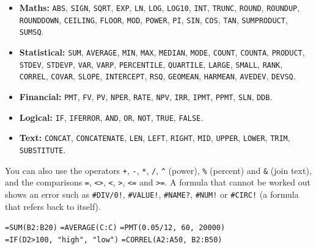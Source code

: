 \documentclass[11pt,a4paper]{article}
\begin{document}
\begin{itemize}
  \item \textbf{Maths:} \texttt{ABS}, \texttt{SIGN}, \texttt{SQRT},
        \texttt{EXP}, \texttt{LN}, \texttt{LOG}, \texttt{LOG10}, \texttt{INT},
        \texttt{TRUNC}, \texttt{ROUND}, \texttt{ROUNDUP}, \texttt{ROUNDDOWN},
        \texttt{CEILING}, \texttt{FLOOR}, \texttt{MOD}, \texttt{POWER},
        \texttt{PI}, \texttt{SIN}, \texttt{COS}, \texttt{TAN},
        \texttt{SUMPRODUCT}, \texttt{SUMSQ}.
  \item \textbf{Statistical:} \texttt{SUM}, \texttt{AVERAGE}, \texttt{MIN},
        \texttt{MAX}, \texttt{MEDIAN}, \texttt{MODE}, \texttt{COUNT},
        \texttt{COUNTA}, \texttt{PRODUCT}, \texttt{STDEV}, \texttt{STDEVP},
        \texttt{VAR}, \texttt{VARP}, \texttt{PERCENTILE}, \texttt{QUARTILE},
        \texttt{LARGE}, \texttt{SMALL}, \texttt{RANK}, \texttt{CORREL},
        \texttt{COVAR}, \texttt{SLOPE}, \texttt{INTERCEPT}, \texttt{RSQ},
        \texttt{GEOMEAN}, \texttt{HARMEAN}, \texttt{AVEDEV}, \texttt{DEVSQ}.
  \item \textbf{Financial:} \texttt{PMT}, \texttt{FV}, \texttt{PV},
        \texttt{NPER}, \texttt{RATE}, \texttt{NPV}, \texttt{IRR}, \texttt{IPMT},
        \texttt{PPMT}, \texttt{SLN}, \texttt{DDB}.
  \item \textbf{Logical:} \texttt{IF}, \texttt{IFERROR}, \texttt{AND},
        \texttt{OR}, \texttt{NOT}, \texttt{TRUE}, \texttt{FALSE}.
  \item \textbf{Text:} \texttt{CONCAT}, \texttt{CONCATENATE}, \texttt{LEN},
        \texttt{LEFT}, \texttt{RIGHT}, \texttt{MID}, \texttt{UPPER},
        \texttt{LOWER}, \texttt{TRIM}, \texttt{SUBSTITUTE}.
\end{itemize}

You can also use the operators \texttt{+}, \texttt{-}, \texttt{*}, \texttt{/},
\texttt{\^{}} (power), \texttt{\%} (percent) and \texttt{\&} (join text), and
the comparisons \texttt{=}, \texttt{<>}, \texttt{<}, \texttt{>}, \texttt{<=} and
\texttt{>=}. A formula that cannot be worked out shows an error such as
\texttt{\#DIV/0!}, \texttt{\#VALUE!}, \texttt{\#NAME?}, \texttt{\#NUM!} or
\texttt{\#CIRC!} (a formula that refers back to itself).

\begin{note}[Examples]
\texttt{=SUM(B2:B20)} \qquad \texttt{=AVERAGE(C:C)} \qquad
\texttt{=PMT(0.05/12, 60, 20000)}\\
\texttt{=IF(D2>100, "high", "low")} \qquad \texttt{=CORREL(A2:A50, B2:B50)}
\end{note}
\end{document}
